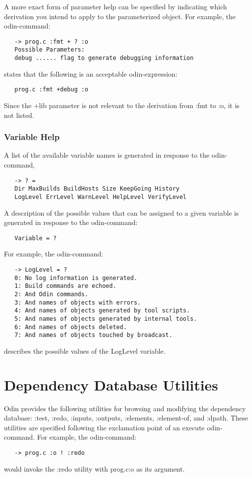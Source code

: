 A more exact form of parameter help can be specified by indicating
which derivation you intend to apply to the parameterized object.
For example, the odin-command:
\begin{verbatim}
   -> prog.c :fmt + ? :o
   Possible Parameters:
   debug ...... flag to generate debugging information
\end{verbatim}
states that the following is an acceptable odin-expression:
\begin{verbatim}
   prog.c :fmt +debug :o
\end{verbatim}
Since the {\ex +lib} parameter is not relevant to the derivation
from {\ex :fmt} to {\ex :o}, it is not listed.

\subsection{Variable Help}

A list of the available variable names is generated in response
to the odin-command,
\begin{verbatim}
   -> ? =
   Dir MaxBuilds BuildHosts Size KeepGoing History
   LogLevel ErrLevel WarnLevel HelpLevel VerifyLevel
\end{verbatim}
A description of the possible values that can be assigned to a
given variable is generated in response to the odin-command:
\begin{verbatim}
   Variable = ?
\end{verbatim}
For example, the odin-command:
\begin{verbatim}
   -> LogLevel = ?
   0: No log information is generated.
   1: Build commands are echoed.
   2: And Odin commands.
   3: And names of objects with errors.
   4: And names of objects generated by tool scripts.
   5: And names of objects generated by internal tools.
   6: And names of objects deleted.
   7: And names of objects touched by broadcast.
\end{verbatim}
describes the possible values of the {\ex LogLevel} variable.


\appendix


\chapter{Dependency Database Utilities}

Odin provides the following utilities for browsing and
modifying the dependency database:
{\ex :test}, {\ex :redo}, {\ex :inputs}, {\ex :outputs},
{\ex :elements}, {\ex :element-of}, and {\ex :dpath}.
These utilities are specified
following the exclamation point of an execute odin-command.
For example, the odin-command:
\begin{verbatim}
   -> prog.c :o ! :redo
\end{verbatim}
would invoke the {\ex :redo} utility with {\ex prog.c:o}
as its argument.

